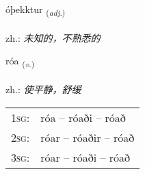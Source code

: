 \documentclass[frontgrid, backgrid]{flacards}\usepackage[]{graphicx}\usepackage[]{xcolor}
\begin{document}
\renewcommand{\flhead}{\vskip5pt \fboxsep=0pt {\small\bfseries\footnotesize Lýsingarorð | 形容词}}
\renewcommand{\fcfoot}{\vskip5pt \fboxsep=0pt \hspace{2pt}{\small\bfseries\footnotesize 3K}}

\renewcommand{\blhead}{\vskip5pt {\small\bfseries\footnotesize Lýsingarorð | 形容词 }}
\renewcommand{\bcfoot}{\vskip5pt \hspace{2pt}{\small\bfseries\footnotesize 3K}}


{óþekktur \small{\textsubscript{(\textit{adj.})}} \\[1ex] %
\textphonetic{[ouːθɛxtʏr]} \\
zh.: \emph{未知的，不熟悉的} \\  [2ex]
\renewcommand*{\arraystretch}{0.8}
}

\renewcommand{\flhead}{\vskip5pt \fboxsep=0pt {\small\bfseries\footnotesize Sagnorð | 动词}}
\renewcommand{\fcfoot}{\vskip5pt \fboxsep=0pt \hspace{2pt}{\small\bfseries\footnotesize 3K}}

\renewcommand{\blhead}{\vskip5pt {\small\bfseries\footnotesize Sagnorð | 动词 }}
\renewcommand{\bcfoot}{\vskip5pt \hspace{2pt}{\small\bfseries\footnotesize 3K}}


{róa \small{\textsubscript{(\textit{v.})}} \\[1ex] %
\textphonetic{[rouːa]} \\
zh.: \emph{使平静，舒缓} \\  [2ex]
\renewcommand*{\arraystretch}{0.8}
\begin{tabular}{p{1cm}l}
\textsc{1sg}: & róa -- róaði -- róað \\ 
\textsc{2sg}: & róar -- róaðir -- róað \\ 
\textsc{3sg}: & róar -- róaði -- róað \\ 
\end{tabular}
}
\end{document}

